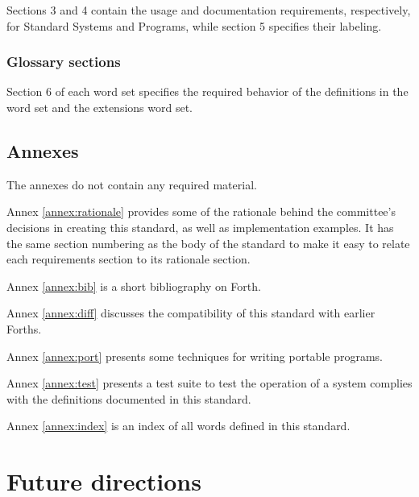 Sections 3 and 4 contain the usage and documentation requirements,
respectively, for Standard Systems and Programs, while section 5
specifies their labeling.


\subsubsection{Glossary sections}

Section 6 of each word set specifies the required behavior of the
definitions in the word set and the extensions word set.

\subsection{Annexes}
\label{intro:annex}

The annexes do not contain any required material.

Annex \ref{annex:rationale} provides some of the rationale behind the
committee's decisions in creating this standard, as well as
implementation examples. It has the same section numbering as the
body of the standard to make it easy to relate each requirements
section to its rationale section.

Annex \ref{annex:bib} is a short bibliography on Forth.


Annex \ref{annex:diff} discusses the compatibility of this standard
with earlier Forths.

Annex \ref{annex:port} presents some techniques for writing portable
programs.

\ifrelease\else
Annex \ref{annex:test} presents a test suite to test the operation
of a system complies with the definitions documented in this
standard.
\fi

Annex \ref{annex:index} is an index of all  words defined in this
standard.

\section{Future directions}

